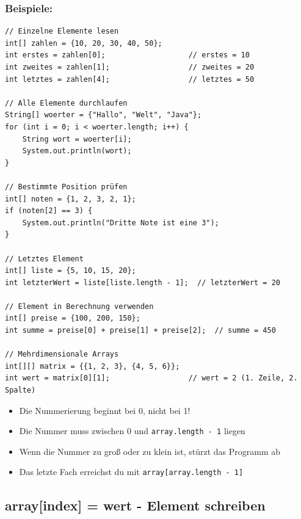 \subsubsection*{Beispiele:}
\begin{lstlisting}
// Einzelne Elemente lesen
int[] zahlen = {10, 20, 30, 40, 50};
int erstes = zahlen[0];                   // erstes = 10
int zweites = zahlen[1];                  // zweites = 20
int letztes = zahlen[4];                  // letztes = 50

// Alle Elemente durchlaufen
String[] woerter = {"Hallo", "Welt", "Java"};
for (int i = 0; i < woerter.length; i++) {
    String wort = woerter[i];
    System.out.println(wort);
}

// Bestimmte Position prüfen
int[] noten = {1, 2, 3, 2, 1};
if (noten[2] == 3) {
    System.out.println("Dritte Note ist eine 3");
}

// Letztes Element
int[] liste = {5, 10, 15, 20};
int letzterWert = liste[liste.length - 1];  // letzterWert = 20

// Element in Berechnung verwenden
int[] preise = {100, 200, 150};
int summe = preise[0] + preise[1] + preise[2];  // summe = 450

// Mehrdimensionale Arrays
int[][] matrix = {{1, 2, 3}, {4, 5, 6}};
int wert = matrix[0][1];                  // wert = 2 (1. Zeile, 2. Spalte)
\end{lstlisting}

\begin{achtung}
	\begin{itemize}
		\item Die Nummerierung beginnt bei 0, nicht bei 1!
		\item Die Nummer muss zwischen 0 und \texttt{array.length - 1} liegen
		\item Wenn die Nummer zu groß oder zu klein ist, stürzt das Programm ab
		\item Das letzte Fach erreichst du mit \texttt{array[array.length - 1]}
	\end{itemize}
\end{achtung}

\newpage


\subsection*{array[index] = wert - Element schreiben}

